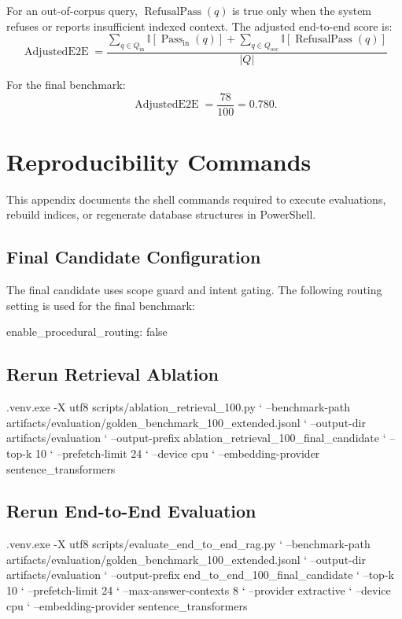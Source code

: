 For an out-of-corpus query, $\operatorname{RefusalPass}(q)$ is true only when the system refuses or reports insufficient indexed context. The adjusted end-to-end score is:
\[
\operatorname{AdjustedE2E} =
\frac{
\sum_{q \in Q_{\mathrm{in}}} \mathbb{I}[\operatorname{Pass}_{\mathrm{in}}(q)]
{}+
\sum_{q \in Q_{\mathrm{ooc}}} \mathbb{I}[\operatorname{RefusalPass}(q)]
}{|Q|}
\]

For the final benchmark:
\[
\operatorname{AdjustedE2E} = \frac{78}{100} = 0.780.
\]

\chapter{Reproducibility Commands}
\label{app:reproducibility-commands}

This appendix documents the shell commands required to execute evaluations, rebuild indices, or regenerate database structures in PowerShell.

\section{Final Candidate Configuration}
The final candidate uses scope guard and intent gating. The following routing setting is used for the final benchmark:
\begin{ThesisCode}
enable_procedural_routing: false
\end{ThesisCode}

\section{Rerun Retrieval Ablation}
\begin{ThesisCode}
.venv\Scripts\python.exe -X utf8 scripts/ablation_retrieval_100.py `
  --benchmark-path artifacts/evaluation/golden_benchmark_100_extended.jsonl `
  --output-dir artifacts/evaluation `
  --output-prefix ablation_retrieval_100_final_candidate `
  --top-k 10 `
  --prefetch-limit 24 `
  --device cpu `
  --embedding-provider sentence_transformers
\end{ThesisCode}

\section{Rerun End-to-End Evaluation}
\begin{ThesisCode}
.venv\Scripts\python.exe -X utf8 scripts/evaluate_end_to_end_rag.py `
  --benchmark-path artifacts/evaluation/golden_benchmark_100_extended.jsonl `
  --output-dir artifacts/evaluation `
  --output-prefix end_to_end_100_final_candidate `
  --top-k 10 `
  --prefetch-limit 24 `
  --max-answer-contexts 8 `
  --provider extractive `
  --device cpu `
  --embedding-provider sentence_transformers
\end{ThesisCode}

